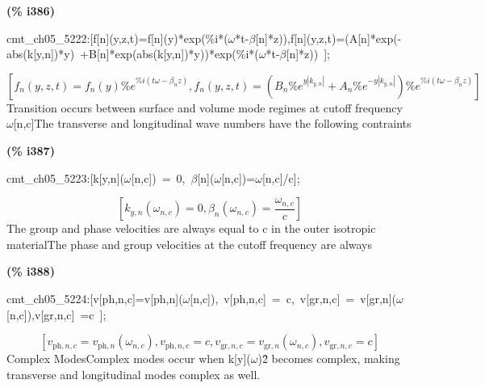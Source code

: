 \documentclass[fleqn]{article}
\begin{document}
\noindent
\begin{minipage}[t]{4.000000em}\color{red}\bfseries
(\% i386)	
\end{minipage}
\begin{minipage}[t]{\textwidth}\color{blue}
cmt\_ch05\_5222:[f[n](y,z,t)=f[n](y)*exp(\%i*(\ensuremath{\omega}*t-\ensuremath{\beta}[n]*z)),f[n](y,z,t)=(A[n]*exp(-abs(k[y,n])*y)\ +B[n]*exp(abs(k[y,n])*y))*exp(\%i*(\ensuremath{\omega}*t-\ensuremath{\beta}[n]*z))\ ];
\end{minipage}
\[\displaystyle \tag{\% o386} 
\operatorname{[}{f_n}\left( y\operatorname{,}z\operatorname{,}t\right) ={f_n}(y) {{\% e}^{\% i \left( t \omega -{{\beta }_n} z\right) }}\operatorname{,}{f_n}\left( y\operatorname{,}z\operatorname{,}t\right) =\left( {B_n} {{\% e}^{y \left| {k_{y,n}}\right| }}+{A_n} {{\% e}^{-y \left| {k_{y,n}}\right| }}\right) {{\% e}^{\% i \left( t \omega -{{\beta }_n} z\right) }}\operatorname{]}\mbox{}
\]
Transition occurs between surface and volume mode regimes at cutoff frequency \ensuremath{\omega}[n,c]The transverse and longitudinal wave numbers have the following contraints


\noindent
\begin{minipage}[t]{4.000000em}\color{red}\bfseries
(\% i387)	
\end{minipage}
\begin{minipage}[t]{\textwidth}\color{blue}
cmt\_ch05\_5223:[k[y,n](\ensuremath{\omega}[n,c])\ =\ 0,\ \ensuremath{\beta}[n](\ensuremath{\omega}[n,c])=\ensuremath{\omega}[n,c]/c];
\end{minipage}
\[\displaystyle \tag{\% o387} 
\left[ {k_{y,n}}\left( {{\omega }_{n,c}}\right) =0\operatorname{,}{{\beta }_n}\left( {{\omega }_{n,c}}\right) =\frac{{{\omega }_{n,c}}}{c}\right] \mbox{}
\]
The group and phase velocities are always equal to c in the outer isotropic materialThe phase and group velocities at the cutoff frequency are always


\noindent
\begin{minipage}[t]{4.000000em}\color{red}\bfseries
(\% i388)	
\end{minipage}
\begin{minipage}[t]{\textwidth}\color{blue}
cmt\_ch05\_5224:[v[ph,n,c]=v[ph,n](\ensuremath{\omega}[n,c]),\ v[ph,n,c]\ =\ c,\ v[gr,n,c]\ =\ v[gr,n](\ensuremath{\omega}[n,c]),v[gr,n,c]\ =c\ ];
\end{minipage}
\[\displaystyle \tag{\% o388} 
\left[ {v_{\ensuremath{\mathrm{ph}},n,c}}={v_{\ensuremath{\mathrm{ph}},n}}\left( {{\omega }_{n,c}}\right) \operatorname{,}{v_{\ensuremath{\mathrm{ph}},n,c}}=c\operatorname{,}{v_{\ensuremath{\mathrm{gr}},n,c}}={v_{\ensuremath{\mathrm{gr}},n}}\left( {{\omega }_{n,c}}\right) \operatorname{,}{v_{\ensuremath{\mathrm{gr}},n,c}}=c\right] \mbox{}
\]
Complex ModesComplex modes occur when k[y](\ensuremath{\omega})\^ 2 becomes complex, making transverse and longitudinal modes complex as well.
\end{document}
